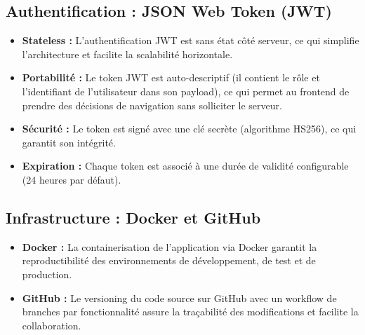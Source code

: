 \documentclass[a4paper,12pt]{report}
\begin{document}
\subsection{Authentification : JSON Web Token (JWT)}

\begin{itemize}
    \item \textbf{Stateless :} L'authentification JWT est sans état côté serveur, ce qui simplifie l'architecture et facilite la scalabilité horizontale.
    \item \textbf{Portabilité :} Le token JWT est auto-descriptif (il contient le rôle et l'identifiant de l'utilisateur dans son payload), ce qui permet au frontend de prendre des décisions de navigation sans solliciter le serveur.
    \item \textbf{Sécurité :} Le token est signé avec une clé secrète (algorithme HS256), ce qui garantit son intégrité.
    \item \textbf{Expiration :} Chaque token est associé à une durée de validité configurable (24 heures par défaut).
\end{itemize}

\subsection{Infrastructure : Docker et GitHub}

\begin{itemize}
    \item \textbf{Docker :} La containerisation de l'application via Docker garantit la reproductibilité des environnements de développement, de test et de production.
    \item \textbf{GitHub :} Le versioning du code source sur GitHub avec un workflow de branches par fonctionnalité assure la traçabilité des modifications et facilite la collaboration.
\end{itemize}
\end{document}
